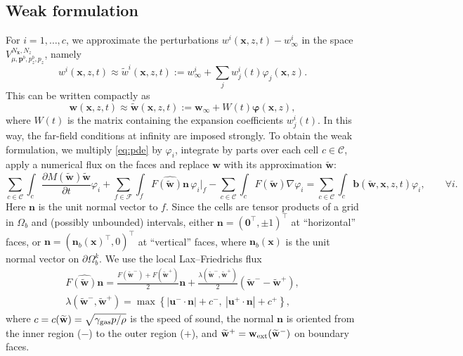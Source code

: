 \documentclass[11pt]{article}
\newcommand{\bw}{\mathbf{w}}
\newcommand{\wt}{\widetilde{\mathbf{w}}}
\newcommand{\bx}{\mathbf{x}}
\newcommand{\bn}{\mathbf{n}}
\newcommand{\bb}{\mathbf{b}}
\newcommand{\bu}{\mathbf{u}}
\newcommand{\Fhat}{\widehat{F(\wt)\bn}}
\begin{document}
	
	\subsection*{Weak formulation}
	
	For $i=1,\dots,c$, we approximate the perturbations $w^i(\bx,z,t)-w^i_\infty$ in the space $V^{N_\bx,N_z}_{\mu,\mathbf{p}^b,p^b_z,p_z}$, namely
	\[
	w^i(\bx,z,t)\approx \widetilde{w}^i(\bx,z,t):=w^i_\infty+\sum_j w_j^i(t)\varphi_j(\bx,z).
	\]
	This can be written compactly as 
	\[
	\bw(\bx,z,t)\approx\wt(\bx,z,t):=\bw_\infty+W(t)\bm{\varphi}(\bx,z),
	\]
	where $W(t)$ is the matrix containing the expansion coefficients $w^i_j(t)$. In this way, the far-field conditions at infinity are imposed strongly. To obtain the weak formulation, we multiply \eqref{eq:pde} by $\varphi_i$, integrate by parts over each cell $c\in\mathcal{C}$, apply a numerical flux on the faces and replace $\bw$ with its approximation $\wt$:
	\begin{equation}\label{eq:weak}
		\sum_{c\in\mathcal{C}}\int_c\frac{\partial M(\wt)\wt}{\partial t}\varphi_i+\sum_{f\in\mathcal{F}}\int_f\Fhat\,\varphi_i\big|_f-\sum_{c\in\mathcal{C}}\int_cF(\wt)\nabla\varphi_i=\sum_{c\in\mathcal{C}}\int_c\bb(\wt,\bx,z,t)\varphi_i,\qquad\forall i.
	\end{equation}
	Here $\bn$ is the unit normal vector to $f$. Since the cells are tensor products of a grid in $\Omega_b$ and (possibly unbounded) intervals, either $\bn=(\mathbf{0}^\top,\pm1)^\top$ at ``horizontal'' faces, or $\bn=(\bn_b(\bx)^\top,0)^\top$ at ``vertical'' faces, where $\bn_b(\bx)$ is the unit normal vector on $\partial\Omega_b^k$. We use the local Lax--Friedrichs flux
	\begin{gather*}
		\Fhat=\frac{F(\wt^-)+F(\wt^+)}{2}\bn+\frac{\lambda(\wt^-,\wt^+)}{2}(\wt^--\wt^+),\\
		\lambda(\wt^-,\wt^+)=\max\left\{|\bu^-\cdot\bn|+c^-,\ |\bu^+\cdot\bn|+c^+\right\},
	\end{gather*}
	where $c=c(\wt)=\sqrt{\gamma_{\rm gas}p/\rho}$ is the speed of sound, the normal $\bn$ is oriented from the inner region ($-$) to the outer region ($+$), and $\wt^+=\bw_{\rm ext}(\wt^-)$ on boundary faces.
	
\end{document}
